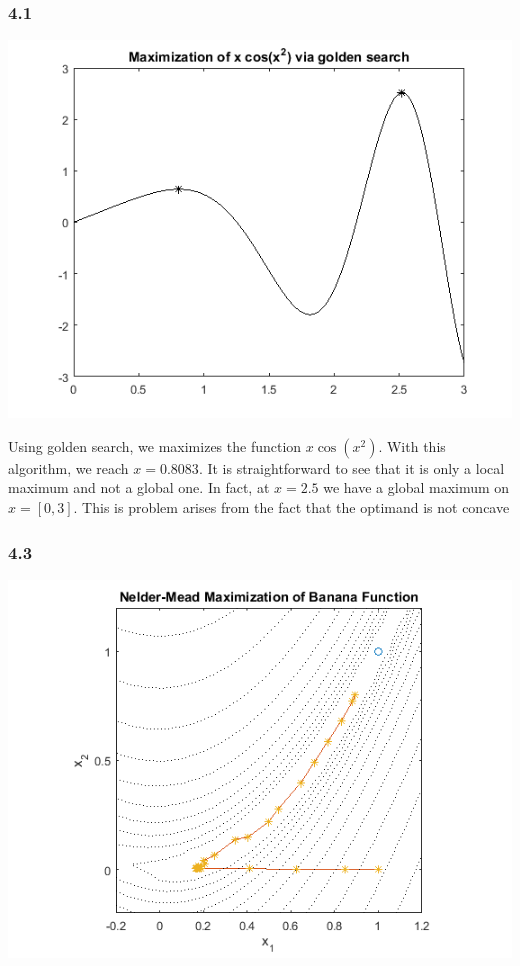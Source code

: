 \documentclass{article}
\begin{document}
\subsubsection*{4.1}

\includegraphics[scale=0.7]{4_1}

Using golden search, we maximizes the function $x\cos (x^2)$. With this algorithm, we reach $x=0.8083$. It is straightforward to see that it is only a local maximum and not a global one. In fact, at $x=2.5$ we have a global maximum on $x=[0,3]$. This is problem arises from the fact that the optimand is not concave

\subsubsection*{4.3}

\includegraphics[scale=0.7]{4_3}
\end{document}
